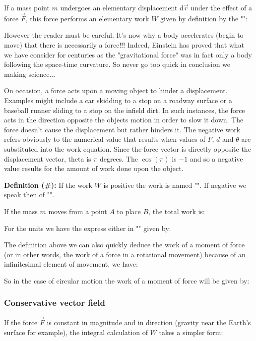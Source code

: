 	If a mass point $m$ undergoes an elementary displacement $\mathrm{d}\vec{r}$ under the effect of a force $\vec{F}$, this force performs an elementary work $W$ given by definition by the "":
	
	However the reader must be careful. It's now why a body accelerates (begin to move) that there is necessarily a force!!! Indeed, Einstein has proved that what we have consider for centuries as the "gravitational force" was in fact only a body following the space-time curvature. So never go too quick in conclusion we making science...
	
	On occasion, a force acts upon a moving object to hinder a displacement. Examples might include a car skidding to a stop on a roadway surface or a baseball runner sliding to a stop on the infield dirt. In such instances, the force acts in the direction opposite the objects motion in order to slow it down. The force doesn't cause the displacement but rather hinders it. The negative work refers obviously to the numerical value that results when values of $F$, $d$ and $\theta$ are substituted into the work equation. Since the force vector is directly opposite the displacement vector, theta is $\pi$ degrees. The $\cos(\pi)$ is $-1$ and so a negative value results for the amount of work done upon the object.
	
	\textbf{Definition (\#\mydef):} If the work $W$ is positive the work is named "". If negative we speak then of "".
	
	If the mass $m$ moves from a point $A$ to place $B$, the total work is:
	
	For the units we have the express either in "" given by:
	
	The definition above we can also quickly deduce the work of a moment of force (or in other words, the work of a force in a rotational movement) because of an infinitesimal element of movement, we have:
	
	So in the case of circular motion the work of a moment of force will be given by:
	
		
	\subsubsection{Conservative vector field}
	If the force $\vec{F}$ is constant in magnitude and in direction (gravity near the Earth's surface for example), the integral calculation of $W$ takes a simpler form:
	
